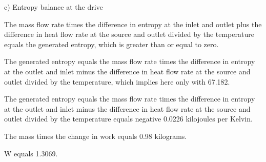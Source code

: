 c) Entropy balance at the drive

The mass flow rate times the difference in entropy at the inlet and outlet plus the difference in heat flow rate at the source and outlet divided by the temperature equals the generated entropy, which is greater than or equal to zero.

The generated entropy equals the mass flow rate times the difference in entropy at the outlet and inlet minus the difference in heat flow rate at the source and outlet divided by the temperature, which implies here only with 67.182.

The generated entropy equals the mass flow rate times the difference in entropy at the outlet and inlet minus the difference in heat flow rate at the source and outlet divided by the temperature equals negative 0.0226 kilojoules per Kelvin.

The mass times the change in work equals 0.98 kilograms.

W equals 1.3069.